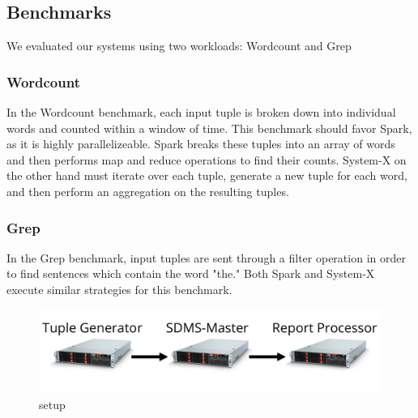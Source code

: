 
\subsection{Benchmarks}
We evaluated our systems using two workloads: Wordcount and Grep

\subsubsection{Wordcount}
In the Wordcount benchmark, each input tuple is broken down into individual words and counted within a window of time.  This benchmark should favor Spark, as it is highly parallelizeable.   Spark breaks these tuples into an array of words and then performs map and reduce operations to find their counts.  System-X on the other hand must iterate over each tuple, generate a new tuple for each word, and then perform an aggregation on the resulting tuples.


\subsubsection{Grep}
In the Grep benchmark, input tuples are sent through a filter operation in order to find sentences which contain the word "the."  Both Spark and System-X execute similar strategies for this benchmark.

\begin{figure}[t]
\centering
\includegraphics[width=1\linewidth]{figures/diagram.pdf}
\caption{setup}
\label{fig:sb1-tput}
\end{figure}



